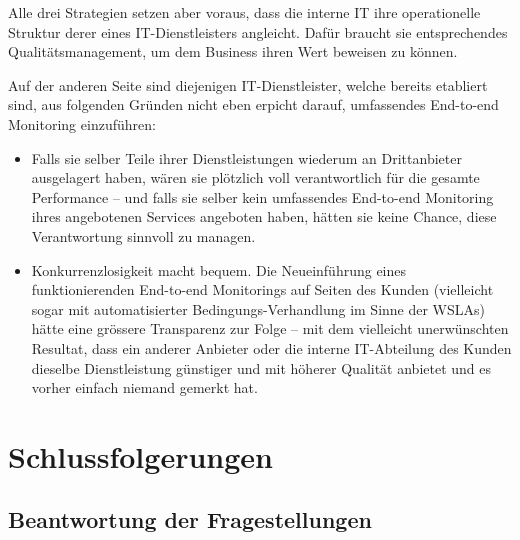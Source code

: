 \documentclass[11pt,listof=totoc]{scrreprt} %
\theoremstyle{definition}
\begin{document}
Alle drei Strategien setzen aber voraus, dass die interne IT ihre operationelle Struktur derer eines IT-Dienstleisters angleicht. Dafür braucht sie entsprechendes Qualitätsmanagement, um dem Business ihren Wert beweisen zu können.

Auf der anderen Seite sind diejenigen IT-Dienstleister, welche bereits etabliert sind, aus folgenden Gründen nicht eben erpicht darauf, umfassendes End-to-end Monitoring einzuführen:

\begin{itemize}
\item Falls sie selber Teile ihrer Dienstleistungen wiederum an Drittanbieter ausgelagert haben, wären sie plötzlich voll verantwortlich für die gesamte Performance -- und falls sie selber kein umfassendes End-to-end Monitoring ihres angebotenen Services angeboten haben, hätten sie keine Chance, diese Verantwortung sinnvoll zu managen.
\item Konkurrenzlosigkeit macht bequem. Die Neueinführung eines funktionierenden End-to-end Monitorings auf Seiten des Kunden (vielleicht sogar mit automatisierter Bedingungs-Verhandlung im Sinne der WSLAs) hätte eine grössere Transparenz zur Folge -- mit dem vielleicht unerwünschten Resultat, dass ein anderer Anbieter oder die interne IT-Abteilung des Kunden dieselbe Dienstleistung günstiger und mit höherer Qualität anbietet und es vorher einfach niemand gemerkt hat.
\end{itemize}

\chapter{Schlussfolgerungen}
\label{fazit}

\section{Beantwortung der Fragestellungen}
\end{document}
